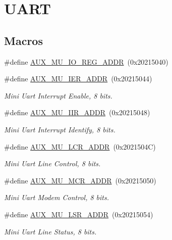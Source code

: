 \hypertarget{group__UART}{}\section{U\+A\+RT}
\label{group__UART}
\subsection*{Macros}
\begin{DoxyCompactItemize}
\item 
\#define \hyperlink{group__UART_gad430fbd4dcccfc37e6a75aac3ed1b407}{A\+U\+X\+\_\+\+M\+U\+\_\+\+I\+O\+\_\+\+R\+E\+G\+\_\+\+A\+D\+DR}~(0x20215040)
\item 
\#define \hyperlink{group__UART_gab7f0b281001eba1983b44e5bd3de3624}{A\+U\+X\+\_\+\+M\+U\+\_\+\+I\+E\+R\+\_\+\+A\+D\+DR}~(0x20215044)
\begin{DoxyCompactList}\small\item\em Mini Uart Interrupt Enable, 8 bits. \end{DoxyCompactList}\item 
\#define \hyperlink{group__UART_ga671559e30e80a6d003fcb46ac99d7723}{A\+U\+X\+\_\+\+M\+U\+\_\+\+I\+I\+R\+\_\+\+A\+D\+DR}~(0x20215048)
\begin{DoxyCompactList}\small\item\em Mini Uart Interrupt Identify, 8 bits. \end{DoxyCompactList}\item 
\#define \hyperlink{group__UART_gaaed9b3cea1302e02eb4ac7cf34e4e166}{A\+U\+X\+\_\+\+M\+U\+\_\+\+L\+C\+R\+\_\+\+A\+D\+DR}~(0x2021504\+C)
\begin{DoxyCompactList}\small\item\em Mini Uart Line Control, 8 bits. \end{DoxyCompactList}\item 
\#define \hyperlink{group__UART_ga76017c2dd6557c4d387828112f1335fe}{A\+U\+X\+\_\+\+M\+U\+\_\+\+M\+C\+R\+\_\+\+A\+D\+DR}~(0x20215050)
\begin{DoxyCompactList}\small\item\em Mini Uart Modem Control, 8 bits. \end{DoxyCompactList}\item 
\#define \hyperlink{group__UART_ga118983fa3b92ba87e7d341722fa0bc31}{A\+U\+X\+\_\+\+M\+U\+\_\+\+L\+S\+R\+\_\+\+A\+D\+DR}~(0x20215054)
\begin{DoxyCompactList}\small\item\em Mini Uart Line Status, 8 bits. \end{DoxyCompactList}\item 

\end{DoxyCompactItemize}
